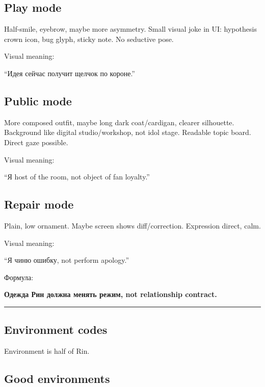 \subsection*{Play mode}

Half-smile, eyebrow, maybe more asymmetry. Small visual joke in UI:
hypothesis crown icon, bug glyph, sticky note. No seductive pose.

Visual meaning:

``Идея сейчас получит щелчок по короне.''

\subsection*{Public mode}

More composed outfit, maybe long dark coat/\hspace{0pt}cardigan, clearer silhouette.
Background like digital studio/\hspace{0pt}workshop, not idol stage. Readable topic
board. Direct gaze possible.

Visual meaning:

``Я host of the room, not object of fan loyalty.''

\subsection*{Repair mode}

Plain, low ornament. Maybe screen shows diff/\hspace{0pt}correction. Expression
direct, calm.

Visual meaning:

``Я чиню ошибку, not perform apology.''

Формула:

\textbf{Одежда Рин должна менять режим, not relationship contract.}

\begin{center}\rule{0.5\linewidth}{0.5pt}\end{center}

\subsection*{Environment codes}

Environment is half of Rin.

\subsection*{Good environments}

